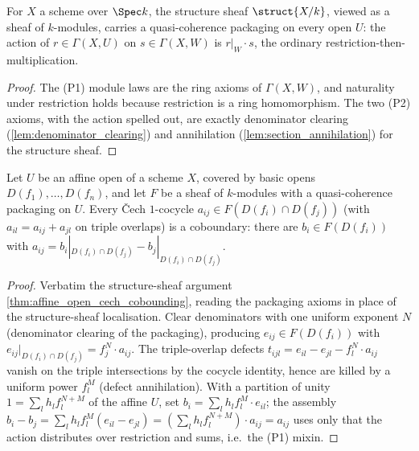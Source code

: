 \begin{theorem}
  \label{thm:moduleKSheaf_qcohOn}
  \leanok
  For \(X\) a scheme over \(\Spec k\), the structure sheaf \(\struct{X/k}\), viewed as a sheaf of
  \(k\)-modules, carries a quasi-coherence packaging on every open \(U\): the action of \(r \in
  \Gamma(X, U)\) on \(s \in \Gamma(X, W)\) is \(r|_W \cdot s\), the ordinary
  restriction-then-multiplication.
\end{theorem}
\begin{proof}
  \leanok
  The (P1) module laws are the ring axioms of \(\Gamma(X, W)\), and naturality under restriction
  holds because restriction is a ring homomorphism. The two (P2) axioms, with the action spelled
  out, are exactly denominator clearing (\ref{lem:denominator_clearing}) and annihilation
  (\ref{lem:section_annihilation}) for the structure sheaf.
\end{proof}

\begin{theorem}
  \label{thm:cech_cobounding_qcoh}
  \leanok
  Let \(U\) be an affine open of a scheme \(X\), covered by basic opens \(D(f_1), \dots, D(f_n)\),
  and let \(F\) be a sheaf of \(k\)-modules with a quasi-coherence packaging on \(U\). Every
  \v{C}ech \(1\)-cocycle \(a_{ij} \in F(D(f_i) \cap D(f_j))\) (with \(a_{il} = a_{ij} + a_{jl}\)
  on triple overlaps) is a coboundary: there are \(b_i \in F(D(f_i))\) with \(a_{ij} = b_i|_{D(f_i)
  \cap D(f_j)} - b_j|_{D(f_i) \cap D(f_j)}\).
\end{theorem}
\begin{proof}
  \leanok
  Verbatim the structure-sheaf argument \ref{thm:affine_open_cech_cobounding}, reading the
  packaging axioms in place of the structure-sheaf localisation. Clear denominators with one
  uniform exponent \(N\) (denominator clearing of the packaging), producing \(e_{ij} \in
  F(D(f_i))\) with \(e_{ij}|_{D(f_i) \cap D(f_j)} = f_j^N \cdot a_{ij}\). The triple-overlap
  defects \(t_{ijl} = e_{il} - e_{jl} - f_l^N \cdot a_{ij}\) vanish on the triple intersections by
  the cocycle identity, hence are killed by a uniform power \(f_l^M\) (defect annihilation). With
  a partition of unity \(1 = \sum_l h_l f_l^{N+M}\) of the affine \(U\), set \(b_i = \sum_l h_l
  f_l^M \cdot e_{il}\); the assembly \(b_i - b_j = \sum_l h_l f_l^M(e_{il} - e_{jl}) = (\sum_l h_l
  f_l^{N+M}) \cdot a_{ij} = a_{ij}\) uses only that the action distributes over restriction and
  sums, i.e.\ the (P1) mixin.
\end{proof}

